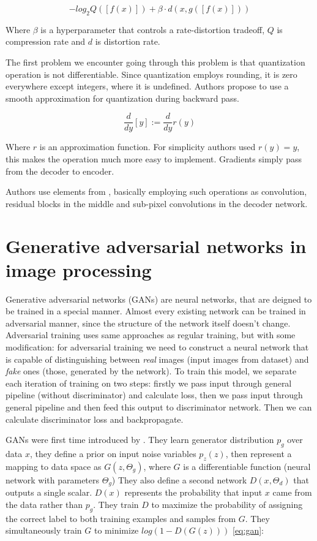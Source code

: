 \begin{equation}
    \label{eq:rate-distortion}
    − log_2 Q ([f (x)]) + \beta · d (x, g([f (x)]))
\end{equation}

Where $\beta$ is a hyperparameter that controls a rate-distortion tradeoff, $Q$ is compression rate and $d$ is distortion rate.

The first problem we encounter going through this problem is that quantization operation is not differentiable. Since quantization employs rounding, it is zero everywhere except integers, where it is undefined. Authors propose to use a smooth approximation for quantization during backward pass.

\begin{equation}
    \label{eq:quantization}
    \frac{d}{dy}[y]:=\frac{d}{dy}r(y)
\end{equation}

Where $r$ is an approximation function. For simplicity authors used $r(y)=y$, this makes the operation much more easy to implement. Gradients simply pass from the decoder to encoder.

Authors use elements from \cite{shi_real-time_2016}, basically employing such operations as convolution, residual blocks in the middle and sub-pixel convolutions in the decoder network.

\section{Generative adversarial networks in image processing}

Generative adversarial networks (GANs) are neural networks, that are deigned to be trained in a special manner. Almost every existing network can be trained in adversarial manner, since the structure of the network itself doesn't change. Adversarial training uses same approaches as regular training, but with some modification: for adversarial training we need to construct a neural network that is capable of distinguishing between \textit{real} images (input images from dataset) and \textit{fake} ones (those, generated by the network). To train this model, we separate each iteration of training on two steps: firstly we pass input through general pipeline (without discriminator) and calculate loss, then we pass input through general pipeline and then feed this output to discriminator network. Then we can calculate discriminator loss and backpropagate.

GANs were first time introduced by \cite[Goodfellow et al]{Goodfellow_Pouget-Abadie_Mirza_Xu_Warde-Farley_Ozair_Courville_Bengio_2014}. They learn generator distribution $p_g$ over data $x$, they define a prior on input noise variables $p_z(z)$, then represent a mapping to data space as $G(z, \Theta_g)$, where $G$ is a differentiable function (neural network with parameters $\Theta_g$) They also define a second network $D(x, \Theta_d)$ that outputs a single scalar. $D(x)$ represents the probability that input $x$ came from the data rather than $p_g$. They train $D$ to maximize the probability of assigning the correct label to both training examples and samples from $G$. They simultaneously train $G$ to minimize $log(1 − D(G(z)))$ \ref{eq:gan}:

